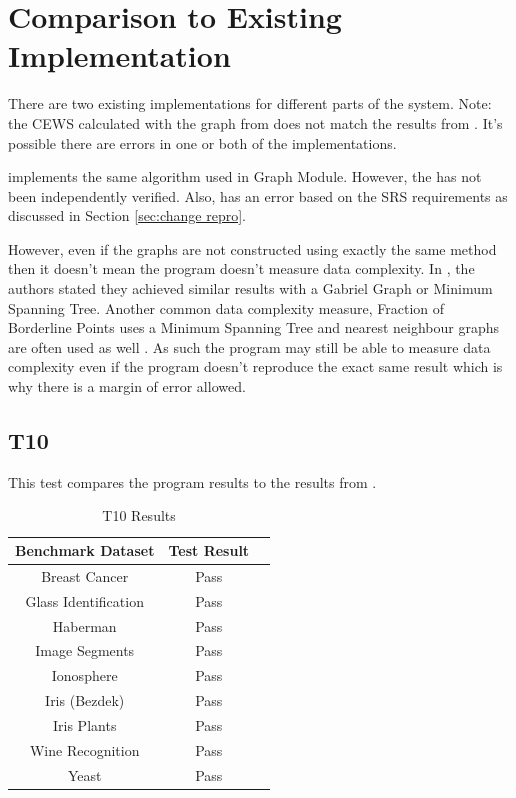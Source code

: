 \documentclass[12pt, titlepage]{article}
\begin{document}
\section{Comparison to Existing Implementation}	\label{sec:comparision}

There are two existing implementations for different parts of the system. 
Note: the CEWS calculated with the graph from \cite{pythonRNG} does not match the results from \cite{zighed_statistical_2005}.
It's possible there are errors in one or both of the implementations.


\cite{pythonRNG} implements the same algorithm used in Graph Module. 
However, the \cite{pythonRNG} has not been independently verified.
Also, \cite{pythonRNG} has an error based on the SRS requirements as discussed in Section \ref{sec:change repro}.

However, even if the graphs are not constructed using exactly the same method then it doesn't mean the program doesn't measure data complexity.
In \cite{zighed_statistical_2005}, the authors stated they achieved similar results with a Gabriel Graph or Minimum Spanning Tree.
Another common data complexity measure, Fraction of Borderline Points uses a Minimum Spanning Tree and nearest neighbour graphs are often used as well \cite{lorena_how_2020}.
As such the program may still be able to measure data complexity even if the program doesn't reproduce the exact same result which is why there is a margin of error allowed.

\subsection{T10} \label{sec:T10}

This test compares the program results to the results from \cite{zighed_statistical_2005}.

\begin{table}[H]
\centering
\begin{tabular}{|c|c|c|}
\hline
Benchmark Dataset & Test Result \\ \hline
Breast Cancer &  Pass\\ \hline
Glass Identification &  Pass\\ \hline
Haberman  &  Pass \\ \hline
Image Segments &  Pass \\ \hline
Ionosphere &  Pass \\ \hline
Iris (Bezdek) &   Pass\\ \hline
Iris Plants &   Pass\\ \hline
Wine Recognition &  Pass \\ \hline
Yeast &  Pass\\ \hline
\end{tabular}
\caption{T10 Results}
\label{Table:t10}
\end{table}
\end{document}
